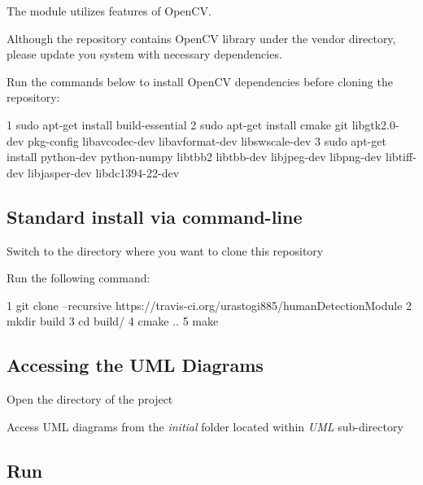 \begin{DoxyItemize}
\item The module utilizes features of Open\+CV.
\item Although the repository contains Open\+CV library under the vendor directory, please update you system with necessary dependencies.
\item Run the commands below to install Open\+CV dependencies before cloning the repository\+: 
\begin{DoxyCode}
1 sudo apt-get install build-essential
2 sudo apt-get install cmake git libgtk2.0-dev pkg-config libavcodec-dev libavformat-dev libswscale-dev
3 sudo apt-get install python-dev python-numpy libtbb2 libtbb-dev libjpeg-dev libpng-dev libtiff-dev
       libjasper-dev libdc1394-22-dev
\end{DoxyCode}

\end{DoxyItemize}

\subsection*{Standard install via command-\/line}


\begin{DoxyItemize}
\item Switch to the directory where you want to clone this repository
\item Run the following command\+: 
\begin{DoxyCode}
1 git clone --recursive https://travis-ci.org/urastogi885/humanDetectionModule
2 mkdir build
3 cd build/
4 cmake ..
5 make
\end{DoxyCode}

\end{DoxyItemize}

\subsection*{Accessing the U\+ML Diagrams}


\begin{DoxyItemize}
\item Open the directory of the project
\item Access U\+ML diagrams from the {\itshape initial} folder located within {\itshape U\+ML} sub-\/directory
\end{DoxyItemize}

\subsection*{Run}


